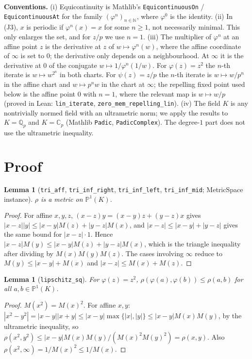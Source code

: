 \documentclass[11pt]{article}
\newtheorem{lemma}[theorem]{Lemma}
\theoremstyle{definition}
\newcommand{\Qp}{\mathbb{Q}_p}
\newcommand{\Cp}{\mathbb{C}_p}
\newcommand{\PP}{\mathbb{P}^1}
\begin{document}
\textbf{Conventions.} (i) Equicontinuity is Mathlib's \texttt{EquicontinuousOn} /
\texttt{EquicontinuousAt} for the family $(\varphi^{n})_{n\in\mathbb{N}}$, where $\varphi^0$ is the
identity. (ii) In (J3), $x$ is periodic if $\varphi^{n}(x)=x$ for some $n\ge1$, not necessarily
minimal. This only enlarges the set, and for $z/p$ we use $n=1$. (iii) The multiplier of
$\varphi^{n}$ at an affine point $z$ is the derivative at $z$ of $w\mapsto\varphi^{n}(w)$, where the
affine coordinate of $\infty$ is set to $0$; the derivative only depends on a neighbourhood. At
$\infty$ it is the derivative at $0$ of the conjugate $w\mapsto 1/\varphi^{n}(1/w)$. For
$\varphi(z)=z^2$ the $n$-th iterate is $w\mapsto w^{2^n}$ in both charts. For $\psi(z)=z/p$ the
$n$-th iterate is $w\mapsto w/p^{n}$ in the affine chart and $w\mapsto p^{n}w$ in the chart at
$\infty$; the repelling fixed point used below is the affine point $0$ with $n=1$, where the
relevant map is $w\mapsto w/p$ (proved in Lean: \texttt{lin\_iterate}, \texttt{zero\_mem\_repelling\_lin}).
(iv) The field $K$ is any nontrivially normed field with an ultrametric norm; we apply the results
to $K=\Qp$ and $K=\Cp$ (Mathlib \texttt{Padic}, \texttt{PadicComplex}). The degree-$1$ part
does not use the ultrametric inequality.

\section{Proof}

\begin{lemma}[\texttt{tri\_aff}, \texttt{tri\_inf\_right}, \texttt{tri\_inf\_left}, \texttt{tri\_inf\_mid}; MetricSpace instance]
$\rho$ is a metric on $\PP(K)$.
\end{lemma}
\begin{proof}
For affine $x,y,z$, $(x-z)y=(x-y)z+(y-z)x$ gives $|x-z||y|\le|x-y|M(z)+|y-z|M(x)$, and
$|x-z|\le|x-y|+|y-z|$ gives the same bound for $|x-z|\cdot1$. Hence $|x-z|M(y)\le
|x-y|M(z)+|y-z|M(x)$, which is the triangle inequality after dividing by $M(x)M(y)M(z)$. The cases
involving $\infty$ reduce to $M(y)\le|x-y|+M(x)$ and $|x-z|\le M(x)+M(z)$.
\end{proof}

\begin{lemma}[\texttt{lipschitz\_sq}]
For $\varphi(z)=z^2$, $\rho(\varphi(a),\varphi(b))\le\rho(a,b)$ for all $a,b\in\PP(K)$.
\end{lemma}
\begin{proof}
$M(x^2)=M(x)^2$. For affine $x,y$: $|x^2-y^2|=|x-y||x+y|\le|x-y|\max\{|x|,|y|\}\le|x-y|M(x)M(y)$,
by the ultrametric inequality, so $\rho(x^2,y^2)\le|x-y|M(x)M(y)/(M(x)^2M(y)^2)=\rho(x,y)$. Also
$\rho(x^2,\infty)=1/M(x)^2\le1/M(x)$.
\end{proof}
\end{document}
